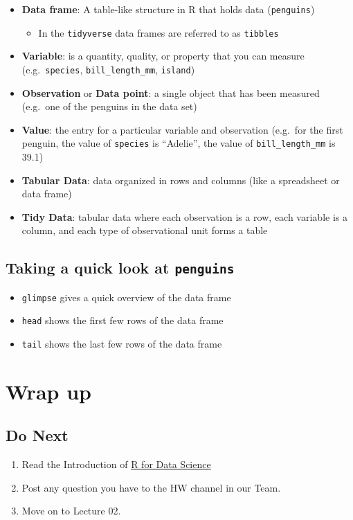 \documentclass[
]{article}
\providecommand{\tightlist}{%
  \setlength{\itemsep}{0pt}\setlength{\parskip}{0pt}}
\begin{document}
\begin{itemize}
\tightlist
\item
  \textbf{Data frame}: A table-like structure in R that holds data
  (\texttt{penguins})

  \begin{itemize}
  \tightlist
  \item
    In the \texttt{tidyverse} data frames are referred to as
    \texttt{tibbles}
  \end{itemize}
\item
  \textbf{Variable}: is a quantity, quality, or property that you can
  measure (e.g.~\texttt{species}, \texttt{bill\_length\_mm},
  \texttt{island})
\item
  \textbf{Observation} or \textbf{Data point}: a single object that has
  been measured (e.g.~one of the penguins in the data set)
\item
  \textbf{Value}: the entry for a particular variable and observation
  (e.g.~for the first penguin, the value of \texttt{species} is
  ``Adelie'', the value of \texttt{bill\_length\_mm} is 39.1)
\item
  \textbf{Tabular Data}: data organized in rows and columns (like a
  spreadsheet or data frame)
\item
  \textbf{Tidy Data}: tabular data where each observation is a row, each
  variable is a column, and each type of observational unit forms a
  table
\end{itemize}

\subsection{\texorpdfstring{Taking a quick look at
\texttt{penguins}}{Taking a quick look at penguins}}\label{taking-a-quick-look-at-penguins}

\begin{itemize}
\tightlist
\item
  \texttt{glimpse} gives a quick overview of the data frame
\item
  \texttt{head} shows the first few rows of the data frame
\item
  \texttt{tail} shows the last few rows of the data frame
\end{itemize}

\section{Wrap up}\label{wrap-up}

\subsection{Do Next}\label{do-next}

\begin{enumerate}
\def\labelenumi{\arabic{enumi}.}
\tightlist
\item
  Read the Introduction of
  \href{https://r4ds.had.co.nz/introduction.html}{R for Data Science}
\item
  Post any question you have to the HW channel in our Team.
\item
  Move on to Lecture 02.
\end{enumerate}
\end{document}
